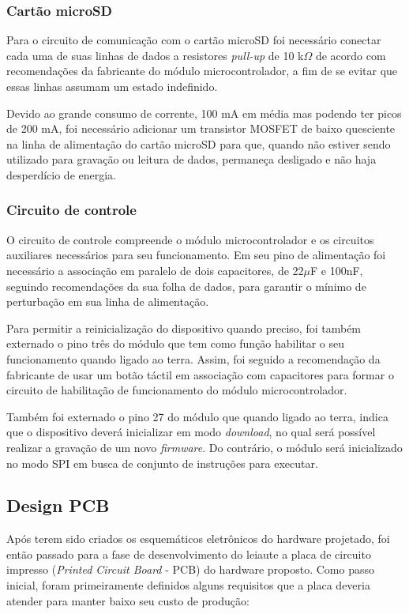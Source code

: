 \subsubsection{Cartão microSD}

Para o circuito de comunicação com o cartão microSD foi necessário conectar cada uma de suas linhas de dados a resistores \textit{pull-up} de 10 k$\Omega$ de acordo com recomendações da fabricante do módulo microcontrolador, a fim de se evitar que essas linhas assumam um estado indefinido. 

Devido ao grande consumo de corrente, 100 mA em média mas podendo ter picos de 200 mA, foi necessário adicionar um transistor MOSFET de baixo quesciente na linha de alimentação do cartão microSD para que, quando não estiver sendo utilizado para gravação ou leitura de dados, permaneça desligado e não haja desperdício de energia.

\subsubsection{Circuito de controle}


O circuito de controle compreende o módulo microcontrolador e os circuitos auxiliares necessários para seu funcionamento. Em seu pino de alimentação foi necessário a associação em paralelo de dois capacitores, de 22$\mu$F e 100nF, seguindo recomendações da sua folha de dados, para garantir o mínimo de perturbação em sua linha de alimentação. 

Para permitir a reinicialização do dispositivo quando preciso, foi também externado o pino três do módulo que tem como função habilitar o seu funcionamento quando ligado ao terra. Assim, foi seguido a recomendação da fabricante de usar um botão táctil em associação com capacitores para formar o circuito de habilitação de funcionamento do módulo microcontrolador.

Também foi externado o pino 27 do módulo que quando ligado ao terra, indica que o dispositivo deverá inicializar em modo \textit{download}, no qual será possível realizar a gravação de um novo \textit{firmware}. Do contrário, o módulo será inicializado no modo SPI em busca de conjunto de instruções para executar. 

\subsection{Design PCB}




Após terem sido criados os esquemáticos eletrônicos do hardware projetado, foi então passado para a fase de desenvolvimento do leiaute a placa de circuito impresso (\textit{Printed Circuit Board} - PCB) do hardware proposto. Como passo inicial, foram primeiramente definidos alguns requisitos que a placa deveria atender para manter baixo seu custo de produção:

